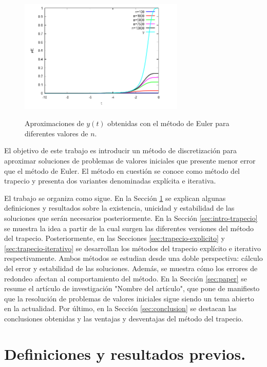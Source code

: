\documentclass{article}
\theoremstyle{theorem-style}  %
\theoremstyle{definition-style}
\theoremstyle{example-style}
\begin{document}
	\begin{figure}[H]
		\centering
		\includegraphics[width=0.7\textwidth]{./Images/eulermaxima.png}
		\label{fig:euler}
		\caption{Aproximaciones de $y(t)$ obtenidas con el método de Euler para diferentes valores de $n$.}
	\end{figure}
	
	El objetivo de este trabajo es introducir un método de discretización para aproximar soluciones de problemas de valores iniciales que presente menor error que el método de Euler. El método en cuestión se conoce como método del trapecio y presenta dos variantes denominadas explícita e iterativa. 
	
	El trabajo se organiza como sigue. En la Sección \ref{sec:previo} se explican algunas definiciones y resultados sobre la existencia, unicidad y estabilidad de las soluciones que serán necesarios posteriormente. En la Sección \ref{sec:intro-trapecio} se muestra la idea a partir de la cual surgen las diferentes versiones del método del trapecio. Posteriormente, en las Secciones \ref{sec:trapecio-explicito} y \ref{sec:trapecio-iterativo} se desarrollan los métodos del trapecio explícito e iterativo respectivamente. Ambos métodos se estudian desde una doble perspectiva: cálculo del error y estabilidad de las soluciones. Además, se muestra cómo los errores de redondeo afectan al comportamiento del método. En la Sección \ref{sec:paper} se resume el artículo de investigación "Nombre del artículo", que pone de manifiesto que la resolución de problemas de valores iniciales sigue siendo un tema abierto en la actualidad. Por último, en la Sección \ref{sec:conclusion} se destacan las conclusiones obtenidas y las ventajas y desventajas del método del trapecio.
	
\section{Definiciones y resultados previos.} \label{sec:previo}
	
\end{document}
